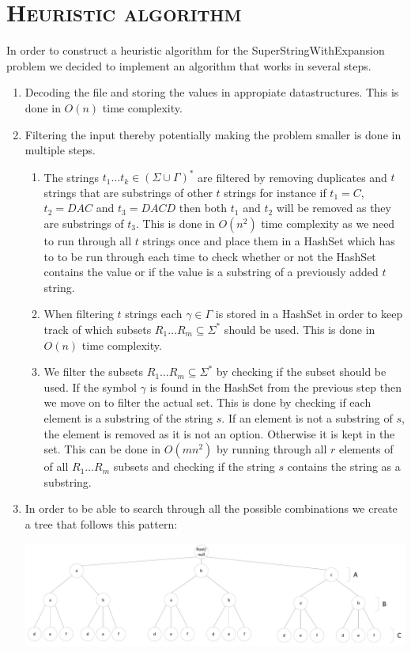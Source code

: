 \documentclass[paper=a4, fontsize=11pt]{scrartcl}
\numberwithin{equation}{section}		%
\numberwithin{figure}{section}			%
\numberwithin{table}{section}				%
\begin{document}
\section{\textsc{Heuristic algorithm}}
In order to construct a heuristic algorithm for the SuperStringWithExpansion problem we decided to implement an algorithm that works in several steps.
\begin{enumerate}
\item
Decoding the file and storing the values in appropiate datastructures. This is done in $O(n)$ time complexity.
\item
Filtering the input thereby potentially making the problem smaller is done in multiple steps.
\begin{enumerate} 
\item
The strings $t_1\ldots t_k \in (\Sigma \cup \Gamma)^*$ are filtered by removing duplicates and $t$ strings that are substrings of other $t$ strings for instance if $t_1=C$, $t_2=DAC$ and $t_3=DACD$ then both $t_1$ and $t_2$ will be removed as they are substrings of $t_3$. This is done in $O(n^2)$ time complexity as we need to run through all $t$ strings once and place them in a HashSet which has to to be run through each time to check whether or not the HashSet contains the value or if the value is a substring of a previously added $t$ string.
\item
 When filtering $t$ strings each $\gamma \in \mathcal{\Gamma}$ is stored in a HashSet in order to keep track of which subsets $R_1\ldots R_m \subseteq \Sigma^*$ should be used. This is done in $O(n)$ time complexity.
\item
We filter the subsets $R_1\ldots R_m \subseteq \Sigma^*$ by checking if the subset should be used. If the symbol $\gamma$ is found in the HashSet from the previous step then we move on to filter the actual set. This is done by checking if each element is a substring of the string $s$. If an element is not a substring of $s$, the element is removed as it is not an option. Otherwise it is kept in the set. This can be done in $O(mn^2)$ by running through all $r$ elements of of all $R_1\ldots R_m$ subsets and checking if the string $s$ contains the string as a substring.
\end{enumerate}
\item
In order to be able to search through all the possible combinations we create a tree that follows this pattern:\par
\includegraphics[width=1\textwidth]{Tree.pdf}

\end{enumerate}
\end{document}
